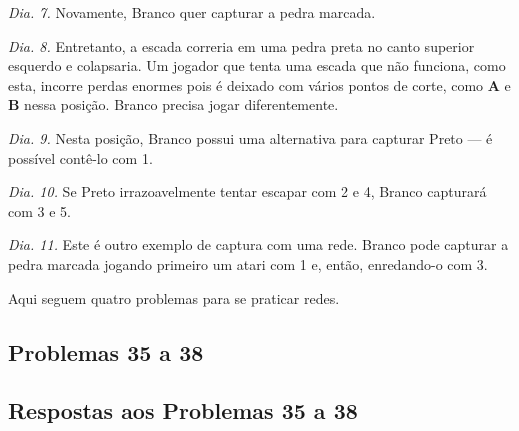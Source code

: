 \emph{Dia. 7.} Novamente, Branco quer capturar a pedra marcada.

\emph{Dia. 8.} Entretanto, a escada correria em uma pedra preta no canto superior esquerdo e colapsaria. Um jogador que tenta uma escada que não funciona, como esta, incorre perdas enormes pois é deixado com vários pontos de corte, como \textbf{A} e \textbf{B} nessa posição. Branco precisa jogar diferentemente.

\emph{Dia. 9.} Nesta posição, Branco possui uma alternativa para capturar Preto --- é possível contê-lo com 1.

\emph{Dia. 10.} Se Preto irrazoavelmente tentar escapar com 2 e 4, Branco capturará com 3 e 5.

\emph{Dia. 11.} Este é outro exemplo de captura com uma rede. Branco pode capturar a pedra marcada jogando primeiro um atari com 1 e, então, enredando-o com 3.

Aqui seguem quatro problemas para se praticar redes.

\subsection{Problemas 35 a 38}

\subsection{Respostas aos Problemas 35 a 38}

